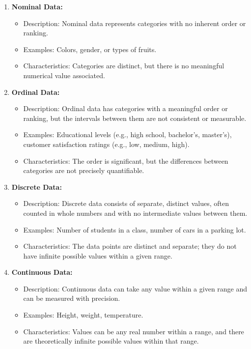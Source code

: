 \documentclass[
  a4paper,
]{scrbook}
\providecommand{\tightlist}{%
  \setlength{\itemsep}{0pt}\setlength{\parskip}{0pt}}\usepackage{longtable,booktabs,array}
\begin{document}
\begin{enumerate}
\def\labelenumi{\arabic{enumi}.}
\tightlist
\item
  \textbf{Nominal Data:}

  \begin{itemize}
  \tightlist
  \item
    Description: Nominal data represents categories with no inherent
    order or ranking.
  \item
    Examples: Colors, gender, or types of fruits.
  \item
    Characteristics: Categories are distinct, but there is no meaningful
    numerical value associated.
  \end{itemize}
\item
  \textbf{Ordinal Data:}

  \begin{itemize}
  \tightlist
  \item
    Description: Ordinal data has categories with a meaningful order or
    ranking, but the intervals between them are not consistent or
    measurable.
  \item
    Examples: Educational levels (e.g., high school, bachelor's,
    master's), customer satisfaction ratings (e.g., low, medium, high).
  \item
    Characteristics: The order is significant, but the differences
    between categories are not precisely quantifiable.
  \end{itemize}
\item
  \textbf{Discrete Data:}

  \begin{itemize}
  \tightlist
  \item
    Description: Discrete data consists of separate, distinct values,
    often counted in whole numbers and with no intermediate values
    between them.
  \item
    Examples: Number of students in a class, number of cars in a parking
    lot.
  \item
    Characteristics: The data points are distinct and separate; they do
    not have infinite possible values within a given range.
  \end{itemize}
\item
  \textbf{Continuous Data:}

  \begin{itemize}
  \tightlist
  \item
    Description: Continuous data can take any value within a given range
    and can be measured with precision.
  \item
    Examples: Height, weight, temperature.
  \item
    Characteristics: Values can be any real number within a range, and
    there are theoretically infinite possible values within that range.
  \end{itemize}
\end{enumerate}
\end{document}
